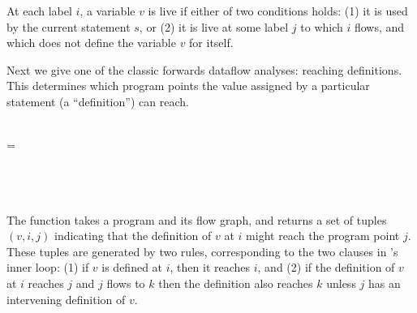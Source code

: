 \noindent
At each label $i$, a variable $v$ is live if either of two conditions holds: (1)
it is used by the current statement $s$, or (2) it is live at some label $j$ to
which $i$ flows, and which does not define the variable $v$ for itself.

Next we give one of the classic forwards dataflow analyses: reaching
definitions. This determines which program points the value assigned by a
particular statement (a ``definition'') can reach.

\nopagebreak[2]
\begin{code}
   \isa \iso{} \to \iso{} \to
  \\
   \< \< =\\
  \quad {}\\
  \quad {}\\
  \quad \phantom{{} \cup}
  \\
  \quad  \cup {}
\end{code}

\noindent
The function  takes a program and its flow graph, and returns a
set of tuples $(v, i, j)$ indicating that the definition of $v$ at $i$ might
reach the program point $j$. These tuples are generated by two rules,
corresponding to the two clauses in 's inner loop: (1) if $v$ is
defined at $i$, then it reaches $i$, and (2) if the definition of $v$ at $i$
reaches $j$ and $j$ flows to $k$ then the definition also reaches $k$ unless $j$
has an intervening definition of $v$.
